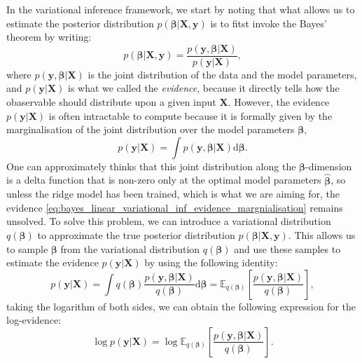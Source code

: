 In the variational inference framework, we start by noting that what allows us to estimate the posterior distribution $p(\boldsymbol{\beta}|\bm{X},\bm{y})$ is to fitst invoke the Bayes' theorem by writing:
\begin{equation}
    \label{eq:bayes_linear_variational_inf}
p(\boldsymbol{\beta}|\bm{X},\bm{y})=\frac{p(\bm{y},\boldsymbol{\beta}|\bm{X})}{p(\bm{y}|\bm{X})},
\end{equation}
where $p(\bm{y},\boldsymbol{\beta}|\bm{X})$ is the joint distribution of the data and the model parameters, and $p(\bm{y}|\bm{X})$ is what we called the \emph{evidence}, because it directly tells how the obaservable should distribute upon a given input $\bm{X}$. However, the evidence $p(\bm{y}|\bm{X})$ is often intractable to compute because it is formally given by the marginalisation of the joint distribution over the model parameters $\boldsymbol{\beta}$,
\begin{equation}
    \label{eq:bayes_linear_variational_inf_evidence_margnialisation}
p(\bm{y}|\bm{X}) = \int p(\bm{y},\boldsymbol{\beta}|\bm{X}) \mathrm{d}\boldsymbol{\beta}.
\end{equation}
One can approximately thinks that this joint distribution along the $\boldsymbol{\beta}$-dimension is a delta function that is non-zero only at the optimal model parameters $\hat{\boldsymbol{\beta}}$, so unless the ridge model has been trained, which is what we are aiming for, the evidence \cref{eq:bayes_linear_variational_inf_evidence_margnialisation} remains unsolved. To solve this problem, we can introduce a variational distribution $q(\boldsymbol{\beta})$ to approximate the true posterior distribution $p(\boldsymbol{\beta}|\bm{X},\bm{y})$. This allows us to sample $\boldsymbol{\beta}$ from the variational distribution $q(\boldsymbol{\beta})$ and use these samples to estimate the evidence $p(\bm{y}|\bm{X})$ by using the following identity:
\begin{equation}    \label{eq:bayes_linear_variational_inf_evidence_estimation}
p(\bm{y}|\bm{X}) = \int q(\boldsymbol{\beta}) \frac{p(\bm{y},\boldsymbol{\beta}|\bm{X})}{q(\boldsymbol{\beta})} \mathrm{d}\boldsymbol{\beta} = \mathbb{E}_{ q(\boldsymbol{\beta})}\left[\frac{p(\bm{y},\boldsymbol{\beta}|\bm{X})}{q(\boldsymbol{\beta})}\right],
\end{equation}
taking the logarithm of both sides, we can obtain the following expression for the log-evidence:
\begin{equation}    
\label{eq:bayes_linear_variational_inf_log_evidence}
\log p(\bm{y}|\bm{X}) = \log \mathbb{E}_{ q(\boldsymbol{\beta})}\left[\frac{p(\bm{y},\boldsymbol{\beta}|\bm{X})}{q(\boldsymbol{\beta})}\right].   
\end{equation}
